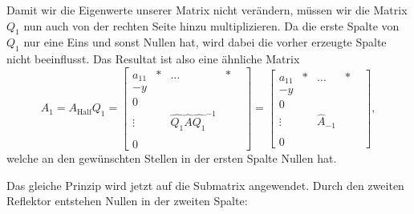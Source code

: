 Damit wir die Eigenwerte unserer Matrix nicht verändern, müssen wir die Matrix $Q_1$ nun auch von der rechten Seite hinzu multiplizieren.
Da die erste Spalte von $Q_1$ nur eine Eins und sonst Nullen hat, wird dabei die vorher erzeugte Spalte nicht beeinflusst.
Das Resultat ist also eine ähnliche Matrix
\begin{equation}
	A_{1}=A_{\text{Half}}Q_{1}=
	\begin{bmatrix}
	a_{11} & * & \dots & *\\
	-y & \\
	0 & & & &\\
	\vdots & &\hat{Q_1}\hat{A}\hat{Q_1}^{-1} &\\
	 & & & &\\
	0 & & & &
	\end{bmatrix}
	=
	\begin{bmatrix}
	a_{11} & * & \dots & *\\
	-y & \\
	0 & & & &\\
	\vdots & &\hat{A}_{-1} &\\
	 & & & &\\
	0 & & & &
	\end{bmatrix},
\end{equation}	
welche an den gewünschten Stellen in der ersten Spalte Nullen hat.

Das gleiche Prinzip wird jetzt auf die Submatrix angewendet.
Durch den zweiten Reflektor entstehen Nullen in der zweiten Spalte:

